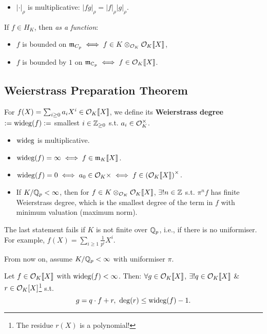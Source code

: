 \begin{itemize}
    \item $|\cdot|_\rho$ is multiplicative: $|fg|_{\rho} = |f|_\rho|g|_\rho$.
\end{itemize}

\begin{example}
    If $f\in H_K$, then \textit{as a function}:\begin{itemize}
        \item $f$ is bounded on $\mathfrak{m}_{C_p}\iff f\in K\otimes_{\mathcal{O}_K}\mathcal{O}_K\llbracket X \rrbracket$,
        \item $f$ is bounded by $1$ on $\mathfrak{m}_{\mathbb{C}_p}\iff f\in\mathcal{O}_K\llbracket X \rrbracket$.
    \end{itemize}
\end{example}

\subsection{Weierstrass Preparation Theorem}
For $f(X) = \sum_{i\ge 0}a_iX^i\in\mathcal{O}_K\llbracket X \rrbracket$, we define its \textbf{Weierstrass degree} $:= \operatorname{wideg}(f) :=$ smallest $i\in\mathbb{Z}_{\ge 0}$ s.t. $a_i\in\mathcal{O}_K^\times$.
\begin{itemize}
    \item $\operatorname{wideg}$ is multiplicative.
    \item $\operatorname{wideg}(f) = \infty\iff f\in\mathfrak{m}_{K}\llbracket X \rrbracket$.
    \item $\operatorname{wideg}(f) = 0\iff a_0\in\mathcal{O}_K\times\iff f\in\left( \mathcal{O}_K\llbracket X \rrbracket \right)^\times$.
    \item If $K/\mathbb{Q}_p < \infty$, then for $f\in K\otimes_{\mathcal{O}_K}\mathcal{O}_K\llbracket X \rrbracket$,
    $\exists ! n\in\mathbb{Z}$ s.t. $\pi^n f$ has finite Weierstrass degree, which is the smallest degree of the term in $f$ with minimum valuation (maximum norm).
\end{itemize}
\begin{remark}
    The last statement fails if $K$ is not finite over $\mathbb{Q}_p$, i.e., if there is no uniformiser. For example, $f(X) = \sum_{i\ge 1}\frac{1}{p^i}X^i$.
\end{remark}
From now on, assume $K/\mathbb{Q}_p < \infty$ with uniformiser $\pi$.
\begin{proposition}
    \label{Euclidean division for power series}
    Let $f\in\mathcal{O}_K\llbracket X \rrbracket$ with $\operatorname{wideg}(f) < \infty$.
    Then: $\forall g\in \mathcal{O}_K\llbracket X \rrbracket$, $\exists ! q\in \mathcal{O}_K\llbracket X \rrbracket$ \& $r\in \mathcal{O}_K[X]$\footnote{The residue $r(X)$ is a polynomial!} s.t. \[g = q\cdot f + r,\ \deg(r)\le \operatorname{wideg}(f) - 1.\]
\end{proposition}
